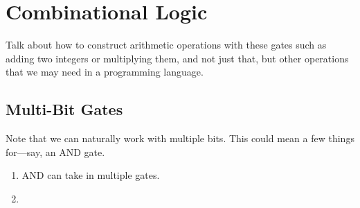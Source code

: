 \section{Combinational Logic}

  Talk about how to construct arithmetic operations with these gates such as adding two integers or multiplying them, and not just that, but other operations that we may need in a programming language. 

\subsection{Multi-Bit Gates}

  Note that we can naturally work with multiple bits. This could mean a few things for---say, an AND gate. 
  \begin{enumerate}
    \item AND can take in multiple gates. 
    \item 
  \end{enumerate}

  \begin{definition}
    \label{def:multi-bit-not-gate}
    
  \end{definition}

  \begin{definition}
    \label{def:multi-bit-and-gate}
    
  \end{definition}

  \begin{definition}
    \label{def:multi-bit-or-gate}
    
  \end{definition}

  \begin{definition}
    \label{def:multi-bit-nand-gate}
    
  \end{definition}

  \begin{definition}
    \label{def:multi-bit-xor-gate}
    
  \end{definition}

  \begin{definition}
    \label{def:multi-bit-multiplexor-gate}
    
  \end{definition}

